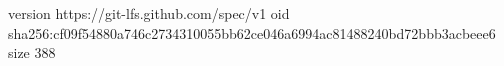 version https://git-lfs.github.com/spec/v1
oid sha256:cf09f54880a746c2734310055bb62ce046a6994ac81488240bd72bbb3acbeee6
size 388

